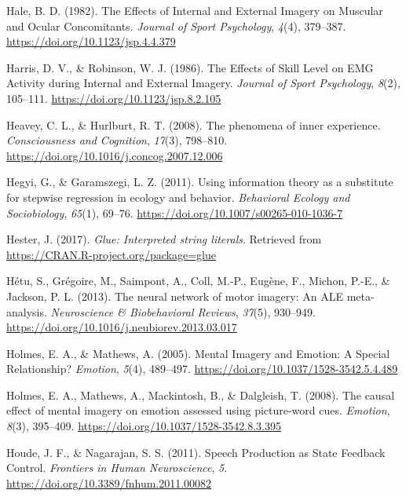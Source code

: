 \documentclass[a4paper,12pt,twoside,openright,oldfontcommands]{memoir}
\begin{document}
\leavevmode\hypertarget{ref-hale_effects_1982}{}%
Hale, B. D. (1982). The Effects of Internal and External Imagery on Muscular and Ocular Concomitants. \emph{Journal of Sport Psychology}, \emph{4}(4), 379--387. \url{https://doi.org/10.1123/jsp.4.4.379}

\leavevmode\hypertarget{ref-harris_effects_1986}{}%
Harris, D. V., \& Robinson, W. J. (1986). The Effects of Skill Level on EMG Activity during Internal and External Imagery. \emph{Journal of Sport Psychology}, \emph{8}(2), 105--111. \url{https://doi.org/10.1123/jsp.8.2.105}

\leavevmode\hypertarget{ref-heavey_phenomena_2008}{}%
Heavey, C. L., \& Hurlburt, R. T. (2008). The phenomena of inner experience. \emph{Consciousness and Cognition}, \emph{17}(3), 798--810. \url{https://doi.org/10.1016/j.concog.2007.12.006}

\leavevmode\hypertarget{ref-hegyi_using_2011}{}%
Hegyi, G., \& Garamszegi, L. Z. (2011). Using information theory as a substitute for stepwise regression in ecology and behavior. \emph{Behavioral Ecology and Sociobiology}, \emph{65}(1), 69--76. \url{https://doi.org/10.1007/s00265-010-1036-7}

\leavevmode\hypertarget{ref-R-glue}{}%
Hester, J. (2017). \emph{Glue: Interpreted string literals}. Retrieved from \url{https://CRAN.R-project.org/package=glue}

\leavevmode\hypertarget{ref-hetu_neural_2013}{}%
Hétu, S., Grégoire, M., Saimpont, A., Coll, M.-P., Eugène, F., Michon, P.-E., \& Jackson, P. L. (2013). The neural network of motor imagery: An ALE meta-analysis. \emph{Neuroscience \& Biobehavioral Reviews}, \emph{37}(5), 930--949. \url{https://doi.org/10.1016/j.neubiorev.2013.03.017}

\leavevmode\hypertarget{ref-holmes_mental_2005}{}%
Holmes, E. A., \& Mathews, A. (2005). Mental Imagery and Emotion: A Special Relationship? \emph{Emotion}, \emph{5}(4), 489--497. \url{https://doi.org/10.1037/1528-3542.5.4.489}

\leavevmode\hypertarget{ref-holmes_causal_2008}{}%
Holmes, E. A., Mathews, A., Mackintosh, B., \& Dalgleish, T. (2008). The causal effect of mental imagery on emotion assessed using picture-word cues. \emph{Emotion}, \emph{8}(3), 395--409. \url{https://doi.org/10.1037/1528-3542.8.3.395}

\leavevmode\hypertarget{ref-houde_speech_2011}{}%
Houde, J. F., \& Nagarajan, S. S. (2011). Speech Production as State Feedback Control. \emph{Frontiers in Human Neuroscience}, \emph{5}. \url{https://doi.org/10.3389/fnhum.2011.00082}
\end{document}
